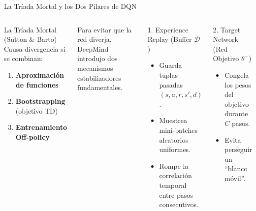 \begin{frame}{La Tríada Mortal y los Dos Pilares de DQN}
  \begin{columns}[T,onlytextwidth]
      \begin{alertblock}{La Tríada Mortal (Sutton \& Barto)}
        Causa divergencia si se combinan:
        \begin{enumerate}
          \item \textbf{Aproximación de funciones}
          \item \textbf{Bootstrapping} (objetivo TD)
          \item \textbf{Entrenamiento Off-policy}
        \end{enumerate}
      \end{alertblock}
      \small Para evitar que la red diverja, DeepMind introdujo dos mecanismos estabilizadores fundamentales.
      \begin{block}{1. Experience Replay (Buffer $\mathcal{D}$)}
        \begin{itemize}
          \item Guarda tuplas pasadas $(s, a, r, s', d)$.
          \item Muestrea mini-batches aleatorios uniformes.
          \item Rompe la correlación temporal entre pasos consecutivos.
        \end{itemize}
      \end{block}
      \begin{block}{2. Target Network (Red Objetivo $\theta^-$)}
        \begin{itemize}
          \item Congela los pesos del objetivo durante $C$ pasos.
          \item Evita perseguir un ``blanco móvil''.
        \end{itemize}
      \end{block}
  \end{columns}
\end{frame}

